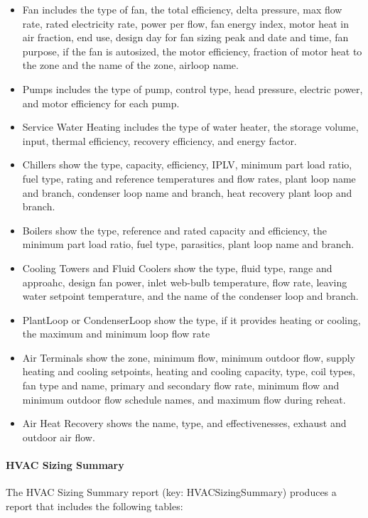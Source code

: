 \begin{itemize}
\item
  Fan includes the type of fan, the total efficiency, delta pressure, max flow rate, rated electricity rate, power per flow, fan energy index, motor heat in air fraction, end use, design day for fan sizing peak and date and time, fan purpose, if the fan is autosized, the motor efficiency, fraction of motor heat to the zone and the name of the zone, airloop name.
\item
  Pumps includes the type of pump, control type, head pressure, electric power, and motor efficiency for each pump.
\item
  Service Water Heating includes the type of water heater, the storage volume, input, thermal efficiency, recovery efficiency, and energy factor.
\item
  Chillers show the type, capacity, efficiency, IPLV, minimum part load ratio, fuel type, rating and reference temperatures and flow rates, plant loop name and branch, condenser loop name and branch, heat recovery plant loop and branch.
\item
  Boilers show the type, reference and rated capacity and efficiency, the minimum part load ratio, fuel type, parasitics, plant loop name and branch.
\item
  Cooling Towers and Fluid Coolers show the type, fluid type, range and approahc, design fan power, inlet web-bulb temperature, flow rate, leaving water setpoint temperature, and the name of the condenser loop and branch.
\item
  PlantLoop or CondenserLoop show the type, if it provides heating or cooling, the maximum and minimum loop flow rate
\item
  Air Terminals show the zone, minimum flow, minimum outdoor flow, supply heating and cooling setpoints, heating and cooling capacity, type, coil types, fan type and name, primary and secondary flow rate, minimum flow and minimum outdoor flow schedule names, and maximum flow during reheat.
\item
  Air Heat Recovery shows the name, type, and effectivenesses, exhaust and outdoor air flow.

\end{itemize}

\paragraph{HVAC Sizing Summary}\label{hvac-sizing-summary}

The HVAC Sizing Summary report (key: HVACSizingSummary) produces a report that includes the following tables:

